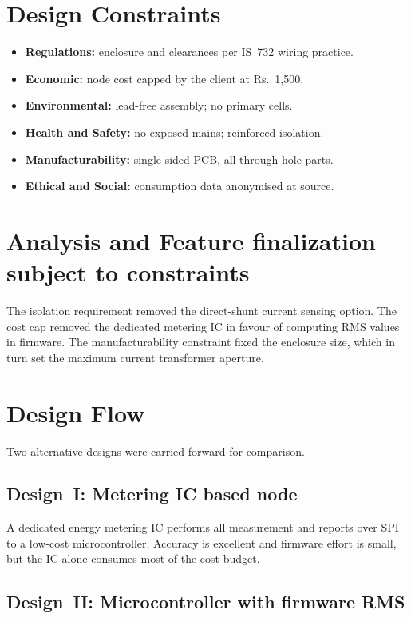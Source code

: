 \documentclass[12pt,a4paper]{report}
\begin{document}
\section{Design Constraints}

\begin{itemize}
  \item \textbf{Regulations:} enclosure and clearances per IS~732 wiring practice.
  \item \textbf{Economic:} node cost capped by the client at Rs.~1,500.
  \item \textbf{Environmental:} lead-free assembly; no primary cells.
  \item \textbf{Health and Safety:} no exposed mains; reinforced isolation.
  \item \textbf{Manufacturability:} single-sided PCB, all through-hole parts.
  \item \textbf{Ethical and Social:} consumption data anonymised at source.
\end{itemize}

\section{Analysis and Feature finalization subject to constraints}

The isolation requirement removed the direct-shunt current sensing option. The
cost cap removed the dedicated metering IC in favour of computing RMS values in
firmware. The manufacturability constraint fixed the enclosure size, which in
turn set the maximum current transformer aperture.

\section{Design Flow}

Two alternative designs were carried forward for comparison.

\subsection{Design~I: Metering IC based node}

A dedicated energy metering IC performs all measurement and reports over SPI to
a low-cost microcontroller. Accuracy is excellent and firmware effort is small,
but the IC alone consumes most of the cost budget.

\subsection{Design~II: Microcontroller with firmware RMS}
\end{document}
